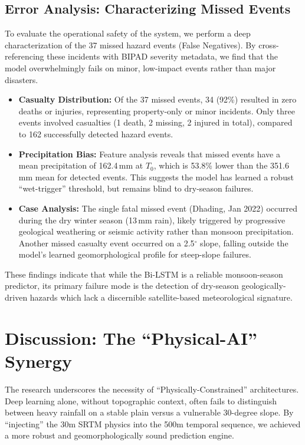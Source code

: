 \documentclass[journal,twoside]{IEEEtran}
\begin{document}
\subsection{Error Analysis: Characterizing Missed Events}
To evaluate the operational safety of the system, we perform a deep characterization of the 37 missed hazard events (False Negatives). By cross-referencing these incidents with BIPAD severity metadata, we find that the model overwhelmingly fails on minor, low-impact events rather than major disasters.

\begin{itemize}
    \item \textbf{Casualty Distribution:} Of the 37 missed events, 34 (92\%) resulted in zero deaths or injuries, representing property-only or minor incidents. Only three events involved casualties (1 death, 2 missing, 2 injured in total), compared to 162 successfully detected hazard events.
    \item \textbf{Precipitation Bias:} Feature analysis reveals that missed events have a mean precipitation of 162.4\,mm at $T_0$, which is 53.8\% lower than the 351.6\,mm mean for detected events. This suggests the model has learned a robust ``wet-trigger'' threshold, but remains blind to dry-season failures.
    \item \textbf{Case Analysis:} The single fatal missed event (Dhading, Jan 2022) occurred during the dry winter season (13\,mm rain), likely triggered by progressive geological weathering or seismic activity rather than monsoon precipitation. Another missed casualty event occurred on a 2.5$^\circ$ slope, falling outside the model's learned geomorphological profile for steep-slope failures.
\end{itemize}

These findings indicate that while the Bi-LSTM is a reliable monsoon-season predictor, its primary failure mode is the detection of dry-season geologically-driven hazards which lack a discernible satellite-based meteorological signature.

\section{Discussion: The ``Physical-AI'' Synergy}
The research underscores the necessity of ``Physically-Constrained'' architectures. Deep learning alone, without topographic context, often fails to distinguish between heavy rainfall on a stable plain versus a vulnerable 30-degree slope. By ``injecting'' the 30m SRTM physics into the 500m temporal sequence, we achieved a more robust and geomorphologically sound prediction engine.
\end{document}
